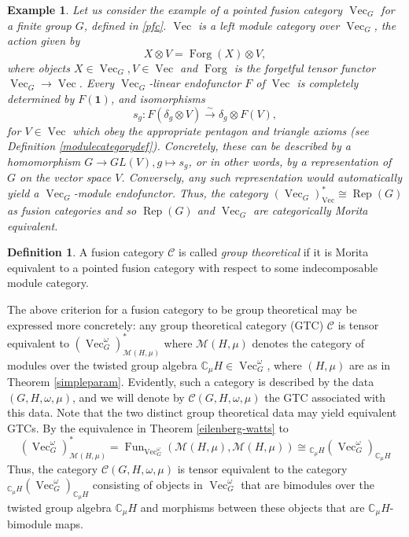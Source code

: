 \documentclass[a4paper, 10pt]{book}
\newtheorem{Expl}[theorem]{Example}
\theoremstyle{definition}
\newtheorem{Def}[theorem]{Definition}
\numberwithin{equation}{chapter}
\newcommand\ot{\otimes}
\newcommand\Rep{\operatorname{Rep}}
\newcommand\Vect{\operatorname{Vec}}
\newcommand\Fun{\operatorname{Fun}}
\newcommand\Forg{\operatorname{Forg}}
\newcommand\CC{\mathbb C}
\newcommand\kk{\mathbb C}
\newcommand\M{\mathcal{M}}
\newcommand\C{\mathcal C}
\newcommand{\ra}\rightarrow
\newcommand{\xra}\xrightarrow
\newcommand\one{\mathbf{1}}
\begin{document}
\begin{Expl}\rm
Let us consider the example of a pointed fusion category $\Vect_G$ for a finite group $G$, defined in \ref{pfc}. $\Vect$ is a left module category over $\Vect_G$, the action given by \begin{equation}
	X\ot V = \Forg(X)\ot V,
\end{equation} where objects $X\in \Vect_G, V\in \Vect$ and $\Forg$ is the forgetful tensor functor $\Vect_G \ra \Vect$. Every $\Vect_G$-linear endofunctor $F$ of $\Vect$ is completely determined by $F(\one)$, and isomorphisms \begin{equation}
	s_g: F(\delta_g\ot V) \xra{\sim}\delta_g\ot F(V),
\end{equation} for $V\in \Vect$ which obey the appropriate pentagon and triangle axioms (see Definition \ref{modulecategorydef}). Concretely, these can be described by a homomorphism $G\ra GL(V), g\mapsto s_g$, or in other words, by a representation of $G$ on the vector space $V$. Conversely, any such representation would automatically yield a $\Vect_G$-module endofunctor. Thus, the category $(\Vect_G)^*_{\Vect}\cong \Rep(G)$ as fusion categories and so $\Rep(G)$ and $\Vect_G$ are categorically Morita equivalent.
\end{Expl} 
\begin{Def}

A fusion category $\mathcal{C}$ is called \textit{group theoretical} if it is Morita equivalent to a pointed fusion category with respect to some indecomposable module category.
\end{Def}
 The above criterion for a fusion category to be group theoretical may be expressed more concretely: any group theoretical category (GTC) $\C$ is tensor equivalent to $(\Vect^\omega_G)^*_{\M(H, \mu)}$ where $\M(H, \mu)$ denotes the category of modules over the twisted group algebra $\kk_\mu H\in \Vect_G^\omega$, where $(H, \mu)$ are as in Theorem \ref{simpleparam}.  Evidently, such a category is described by the data $(G, H, \omega, \mu)$, and we will denote by $\C(G, H, \omega, \mu)$ the GTC associated with this data. Note that the two distinct group theoretical data may yield equivalent GTCs.
By the equivalence in Theorem \ref{eilenberg-watts} to \begin{equation}\label{gtbimod}
	(\Vect^\omega_G)^*_{\M(H, \mu)} = \Fun_{\Vect^\omega_G}(\M(H, \mu), \M(H, \mu)) \cong {}_{\CC_\mu H}(\Vect^\omega_G)_{\CC_\mu H}
\end{equation} 
Thus, the category $\C(G, H, \omega, \mu)$ is tensor equivalent to the category ${}_{\CC_\mu H}(\Vect^\omega_G)_{\CC_\mu H}$ consisting of objects in $\Vect^\omega_G$ that are bimodules over the twisted group algebra $\mathbb{C}_\mu H$ and morphisms between these objects that are $\CC_\mu H$-bimodule maps. 
\end{document}
